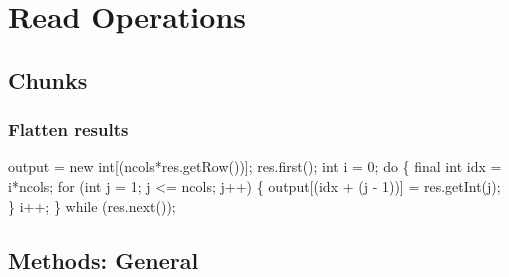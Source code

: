 \nwenddocs{}\chapter{Read Operations}
\label{read}

\section{Chunks}

\subsection{Flatten results}
\nwenddocs{}\endmoddef{}
output = new int[(ncols*res.getRow())];
res.first();
int i = 0;
do \{
  final int idx = i*ncols;
  for (int j = 1; j <= ncols; j++) \{
    output[(idx + (j - 1))] = res.getInt(j);
  \}
  i++;
\} while (res.next());
\nwendcode{}\nwdocspar

\section{Methods: General}

